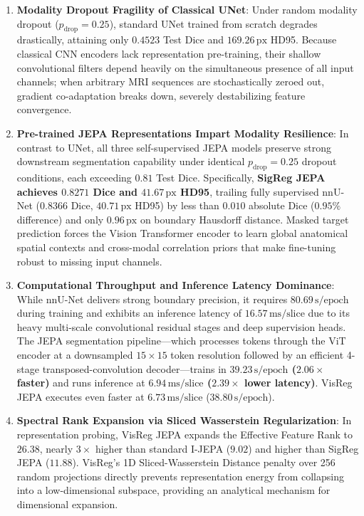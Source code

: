 \documentclass{article}
\begin{document}
\begin{enumerate}
    \item \textbf{Modality Dropout Fragility of Classical UNet}: Under random modality dropout ($p_{\text{drop}} = 0.25$), standard UNet trained from scratch degrades drastically, attaining only $0.4523$ Test Dice and $169.26\,\text{px}$ HD95. Because classical CNN encoders lack representation pre-training, their shallow convolutional filters depend heavily on the simultaneous presence of all input channels; when arbitrary MRI sequences are stochastically zeroed out, gradient co-adaptation breaks down, severely destabilizing feature convergence.
    
    \item \textbf{Pre-trained JEPA Representations Impart Modality Resilience}: In contrast to UNet, all three self-supervised JEPA models preserve strong downstream segmentation capability under identical $p_{\text{drop}} = 0.25$ dropout conditions, each exceeding $0.81$ Test Dice. Specifically, \textbf{SigReg JEPA achieves $0.8271$ Dice and $41.67\,\text{px}$ HD95}, trailing fully supervised nnU-Net ($0.8366$ Dice, $40.71\,\text{px}$ HD95) by less than $0.010$ absolute Dice ($0.95\%$ difference) and only $0.96\,\text{px}$ on boundary Hausdorff distance. Masked target prediction forces the Vision Transformer encoder to learn global anatomical spatial contexts and cross-modal correlation priors that make fine-tuning robust to missing input channels.
    
    \item \textbf{Computational Throughput and Inference Latency Dominance}: While nnU-Net delivers strong boundary precision, it requires $80.69\,\text{s/epoch}$ during training and exhibits an inference latency of $16.57\,\text{ms/slice}$ due to its heavy multi-scale convolutional residual stages and deep supervision heads. The JEPA segmentation pipeline—which processes tokens through the ViT encoder at a downsampled $15 \times 15$ token resolution followed by an efficient 4-stage transposed-convolution decoder—trains in \textbf{$39.23\,\text{s/epoch}$ ($2.06\times$ faster)} and runs inference at \textbf{$6.94\,\text{ms/slice}$ ($2.39\times$ lower latency)}. VisReg JEPA executes even faster at \textbf{$6.73\,\text{ms/slice}$} ($38.80\,\text{s/epoch}$).
    
    \item \textbf{Spectral Rank Expansion via Sliced Wasserstein Regularization}: In representation probing, VisReg JEPA expands the Effective Feature Rank to \textbf{$26.38$}, nearly $3\times$ higher than standard I-JEPA ($9.02$) and higher than SigReg JEPA ($11.88$). VisReg's 1D Sliced-Wasserstein Distance penalty over 256 random projections directly prevents representation energy from collapsing into a low-dimensional subspace, providing an analytical mechanism for dimensional expansion.
\end{enumerate}
\end{document}
